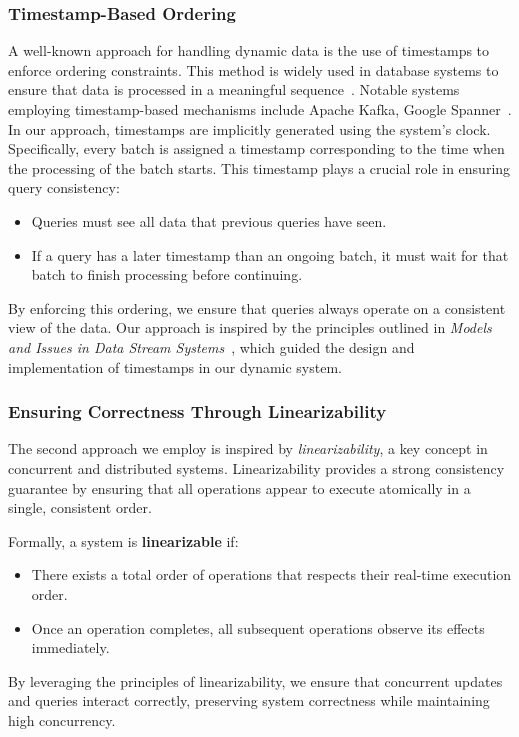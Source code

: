 \documentclass[a4paper,11pt,twoside,openany]{book}
\begin{document}
\subsubsection{Timestamp-Based Ordering}  

A well-known approach for handling dynamic data is the use of timestamps to enforce ordering 
constraints. This method is widely used in database systems to ensure that data is processed
in a meaningful sequence~\cite{babcock2002}. Notable systems employing timestamp-based mechanisms include
Apache Kafka, Google Spanner~\cite{kafka2021,spanner2013}.  
% 
In our approach, timestamps are implicitly generated using the system's clock. Specifically,
every batch is assigned a timestamp corresponding to the time when the processing of the batch starts.
This timestamp plays a crucial role in ensuring query consistency:  

\begin{itemize}  
    \item Queries must see all data that previous queries have seen.  
    \item If a query has a later timestamp than an ongoing batch, it must wait for that batch to
     finish processing before continuing.  
\end{itemize}  
% 
By enforcing this ordering, we ensure that queries always operate on a consistent view of the data.
Our approach is inspired by the principles outlined in \textit{Models and Issues in Data Stream
Systems}~\cite{babcock2002}, which guided the design and implementation of timestamps in our dynamic system.  

\subsubsection{Ensuring Correctness Through Linearizability}  

The second approach we employ is inspired by \textit{linearizability}, a key concept in concurrent
and distributed systems. Linearizability provides a strong consistency guarantee by ensuring
that all operations appear to execute atomically in a single, consistent order.  

Formally, a system is \textbf{linearizable} if:  
\begin{itemize}  
    \item There exists a total order of operations that respects their real-time execution order.  
    \item Once an operation completes, all subsequent operations observe its effects immediately.  
\end{itemize} 
% 
By leveraging the principles of linearizability, we ensure that concurrent updates and queries
interact correctly, preserving system correctness while maintaining high concurrency. 
\end{document}
